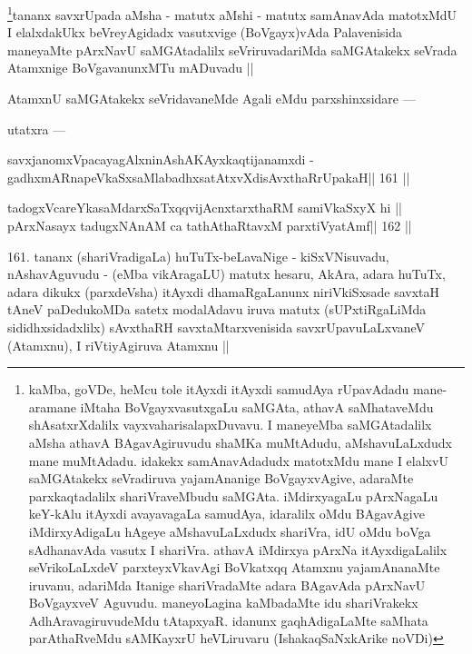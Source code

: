 \begin{artha}
\footnote[8]{kaMba, goVDe, heMcu tole itAyxdi itAyxdi samudAya rUpavAdadu mane-aramane iMtaha BoVgayxvasutxgaLu saMGAta, athavA saMhataveMdu shAsatxrXdalilx vayxvaharisalapxDuvavu. I maneyeMba saMGAtadalilx aMsha athavA BAgavAgiruvudu shaMKa muMtAdudu, aMshavuLaLxdudx mane muMtAdadu. idakekx samAnavAdadudx matotxMdu mane I elalxvU saMGAtakekx seVradiruva yajamAnanige BoVgayxvAgive, adaraMte parxkaqtadalilx shariVraveMbudu saMGAta. iMdirxyagaLu pArxNagaLu keY-kAlu itAyxdi avayavagaLa samudAya, idaralilx oMdu BAgavAgive iMdirxyAdigaLu hAgeye aMshavuLaLxdudx shariVra, idU oMdu boVga sAdhanavAda vasutx I shariVra. athavA iMdirxya pArxNa itAyxdigaLalilx seVrikoLaLxdeV parxteyxVkavAgi BoVkatxqq Atamxnu yajamAnanaMte iruvanu, adariMda Itanige shariVradaMte adara BAgavAda pArxNavU BoVgayxveV Aguvudu. maneyoLagina kaMbadaMte idu shariVrakekx AdhAravagiruvudeMdu tAtapxyaR. idanunx gaqhAdigaLaMte saMhata parAthaRveMdu sAMKayxrU heVLiruvaru (IshakaqSaNxkArike noVDi)}tananx savxrUpada aMsha - matutx aMshi - matutx samAnavAda matotxMdU I elalxdakUkx beVreyAgidadx vasutxvige (BoVgayx)vAda Palavenisida maneyaMte pArxNavU saMGAtadalilx seVriruvadariMda saMGAtakekx seVrada Atamxnige BoVgavanunxMTu mADuvadu ||
\end{artha}

\begin{artha}
AtamxnU saMGAtakekx seVridavaneMde Agali eMdu parxshinxsidare ---
\end{artha}

\begin{artha}
utatxra ---
\end{artha}

\begin{shl}
savxjanomxVpacayagAlxninAshAKAyxkaqtijanamxdi -
gadhxmARnapeVkaSxsaMlabadhxsatAtxvXdisAvxthaRrUpakaH\hfill || 161 ||
\end{shl}

\begin{shl}
tadogxVcareYkasaMdarxSaTxqqvijAcnxtarxthaRM samiVkaSxyX hi ||
pArxNasayx tadugxNAnAM ca tathAthaRtavxM parxtiVyatAmf\hfill || 162 ||
\end{shl}

\begin{artha}
161. tananx (shariVradigaLa) huTuTx-beLavaNige - kiSxVNisuvadu, nAshavAguvudu - (eMba vikAragaLU) matutx hesaru, AkAra, adara huTuTx, adara dikukx (parxdeVsha) itAyxdi dhamaRgaLanunx niriVkiSxsade savxtaH tAneV paDedukoMDa satetx modalAdavu iruva matutx (sUPxtiRgaLiMda sididhxsidadxlilx) sAvxthaRH savxtaMtarxvenisida savxrUpavuLaLxvaneV (Atamxnu), I riVtiyAgiruva Atamxnu ||
\end{artha}

